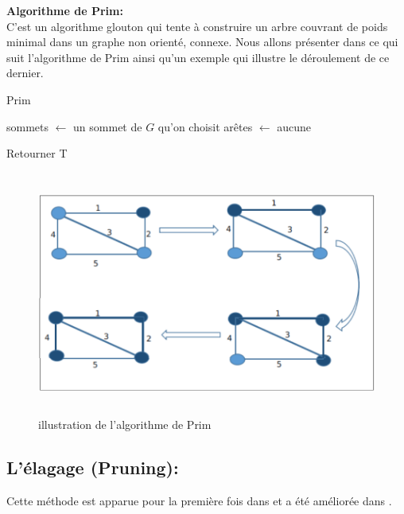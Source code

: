 \textbf{Algorithme de Prim:}\\
C’est un algorithme  glouton qui tente à construire un arbre couvrant de poids minimal dans un graphe non orienté, connexe. Nous allons présenter dans ce qui suit l’algorithme de Prim ainsi qu’un exemple qui illustre le déroulement de ce dernier.

\begin{algorithm}[H]
\label{alg3:prim}
\caption{Prim}
\SetAlgoLined
\DontPrintSemicolon

sommets $\gets$ un sommet de $G$ qu’on choisit \;
arêtes $\gets$ aucune 

Retourner T \;
\end{algorithm}

\begin{figure}[H]
	\centering
	\includegraphics[width=15cm,height=8cm]{Chap3/3.png}
	\caption{illustration de l’algorithme de Prim}
	\label{fig:33}
\end{figure}


\subsection{L’élagage (Pruning):}
Cette méthode est apparue pour la première fois dans \cite{shin2010approximation,zhang2008new} et a été améliorée dans \cite{sundar2013new}.

